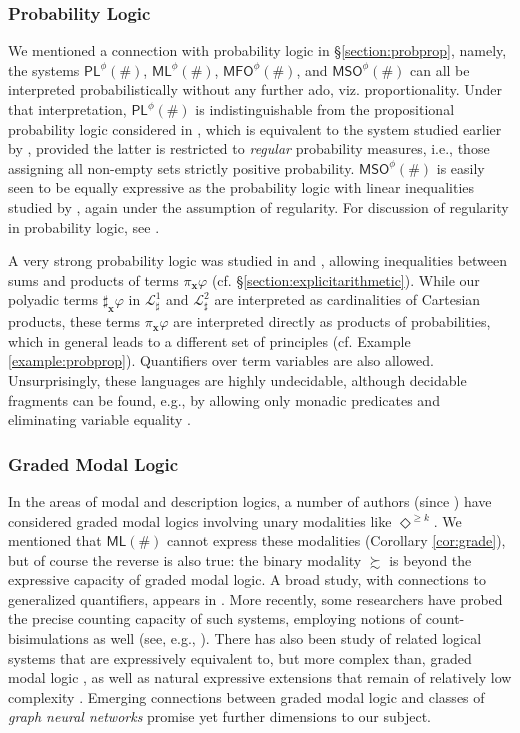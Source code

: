 \documentclass[12pt,oneside,reqno]{amsart}
\theoremstyle{definition}
\begin{document}
\subsubsection*{Probability Logic} We mentioned a connection with probability logic in \S\ref{section:probprop}, namely, the systems $\mathsf{PL}^\phi(\#)$, $\mathsf{ML}^\phi(\#)$, $\mathsf{MFO}^\phi(\#)$, and $\mathsf{MSO}^\phi(\#)$ can all be interpreted probabilistically without any further ado, viz. proportionality. Under that interpretation, $\mathsf{PL}^\phi(\#)$ is indistinguishable from the propositional probability logic considered in \cite{Hoek1996b}, which is equivalent to the system studied earlier by \cite{Gardenfors1975}, provided the latter is restricted to \emph{regular} probability measures, i.e., those assigning all non-empty sets strictly positive probability. $\mathsf{MSO}^\phi(\#)$ is easily seen to be equally expressive as the probability logic with linear inequalities studied by \cite{Fagin}, again under the assumption of regularity. For discussion of regularity in probability logic, see \cite{Ding2021}. 

A very strong probability logic was studied in \cite{Bacchus} and \cite{Halpern}, allowing inequalities between sums and products of terms $\pi_\mathbf{x}\varphi$ (cf. \S\ref{section:explicitarithmetic}). While our polyadic terms $\sharp_\mathbf{x} \varphi$ in $\mathcal{L}_{\sharp}^1$ and $\mathcal{L}_{\sharp}^2$ are interpreted as cardinalities of Cartesian products, these terms $\pi_\mathbf{x}\varphi$ are interpreted directly as products of probabilities, which in general leads to a different set of principles (cf. Example \ref{example:probprop}). Quantifiers over term variables are also allowed. Unsurprisingly, these languages are highly undecidable, although decidable fragments can be found, e.g., by allowing only monadic predicates and eliminating variable equality \citep{Halpern}.

\subsubsection*{Graded Modal Logic} In the areas of modal and description logics, a number of authors (since \citealt{Fine}) have considered graded modal logics involving unary modalities like $\Diamond^{\geq k}$. We mentioned that $\mathsf{ML}(\#)$ cannot express these modalities (Corollary \ref{cor:grade}), but of course the reverse is also true: the binary modality $\succsim$ is beyond the expressive capacity of graded modal logic. A broad study, with connections to generalized quantifiers, appears in \cite{Hoek1993}. More recently, some researchers have probed the precise counting capacity of such systems, employing notions of count-bisimulations as well (see, e.g., \citealt{Baader}). There has also been study of related logical systems that are expressively equivalent to, but more complex than, graded modal logic \citep{Bednarczyk}, as well as natural expressive extensions that remain of relatively low complexity \citep{DEMRI2010233}. Emerging connections between graded modal logic and classes of \emph{graph neural networks} \citep{Barcelo} promise yet further dimensions to our subject.
\end{document}
